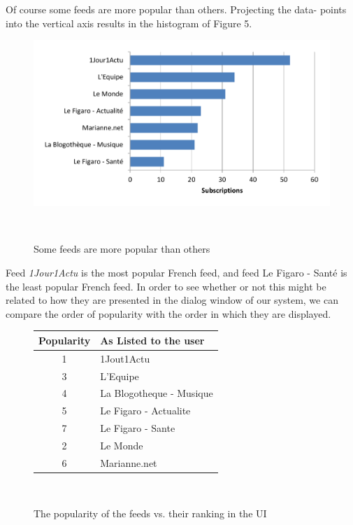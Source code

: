 Of course some feeds are more popular than others. Projecting the data- points into the vertical axis results in the histogram of Figure 5.

\begin{figure}[h!]
\centering
  \includegraphics[width=\columnwidth]{figures/feed_popularity}
  \caption{Some feeds are more popular than others}~\label{fig:registrations}
\end{figure}


Feed {\em 1Jour1Actu} is the most popular French feed, and feed Le Figaro - Sant\'e is the least popular French feed. In order to see whether or not this might be related to how they are presented in the dialog window of our system, we can compare the order of popularity with the order in which they are displayed.

\begin{figure}[h!]
\centering
\bgroup
\def\arraystretch{1.5}
  \begin{tabular}{| c | l | }
    \hline
    \textbf{Popularity} & \textbf{As Listed to the user} \\ \hline
    1 & 1Jout1Actu \\ \hline
    3 & L'Equipe \\ \hline
    4 & La Blogotheque - Musique \\ \hline
    5 & Le Figaro - Actualite \\ \hline
    7 & Le Figaro - Sante \\ \hline
    2 & Le Monde \\ \hline
    6 & Marianne.net \\
    \hline
  \end{tabular}
  \egroup
  \vspace{10pt}
  \caption{The popularity of the feeds vs. their ranking in the UI}~\label{fig:registrations}
\end{figure}


